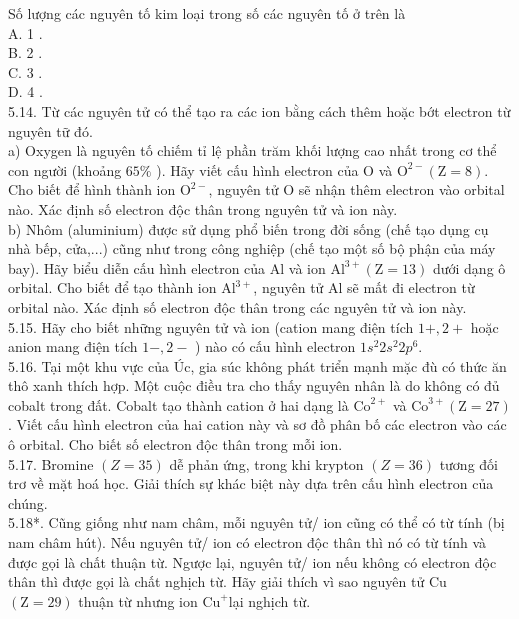 \documentclass[10pt]{article}
\begin{document}
Số lượng các nguyên tố kim loại trong số các nguyên tố ở trên là\\
A. 1 .\\
B. 2 .\\
C. 3 .\\
D. 4 .\\
5.14. Từ các nguyên tử có thể tạo ra các ion bằng cách thêm hoặc bớt electron từ nguyên tữ đó.\\
a) Oxygen là nguyên tố chiếm tỉ lệ phần trăm khối lượng cao nhất trong cơ thể con người (khoảng $65 \%$ ). Hãy viết cấu hình electron của O và $\mathrm{O}^{2-}(\mathrm{Z}=8)$. Cho biết để hình thành ion $\mathrm{O}^{2-}$, nguyên tử O sẽ nhận thêm electron vào orbital nào. Xác định số electron độc thân trong nguyên tử và ion này.\\
b) Nhôm (aluminium) được sử dụng phổ biến trong đời sống (chế tạo dụng cụ nhà bếp, cửa,...) cũng như trong công nghiệp (chế tạo một số bộ phận của máy bay). Hãy biểu diễn cấu hình electron của Al và ion $\mathrm{Al}^{3+}(\mathrm{Z}=13)$ dưới dạng ô orbital. Cho biết để tạo thành ion $\mathrm{Al}^{3+}$, nguyên tử Al sẽ mất đi electron từ orbital nào. Xác định số electron độc thân trong các nguyên tử và ion này.\\
5.15. Hãy cho biết những nguyên tử và ion (cation mang điện tích $1+, 2+$ hoặc anion mang điện tích $1-, 2-$ ) nào có cấu hình electron $1 s^{2} 2 s^{2} 2 p^{6}$.\\
5.16. Tại một khu vực của Úc, gia súc không phát triển mạnh mặc đù có thức ăn thô xanh thích hợp. Một cuộc điều tra cho thấy nguyên nhân là do không có đủ cobalt trong đất. Cobalt tạo thành cation ở hai dạng là $\mathrm{Co}^{2+}$ và $\mathrm{Co}^{3+}(\mathrm{Z}=27)$. Viết cấu hình electron của hai cation này và sơ đồ phân bố các electron vào các ô orbital. Cho biết số electron độc thân trong mỗi ion.\\
5.17. Bromine $(Z=35)$ dễ phản ứng, trong khi krypton $(Z=36)$ tương đối trơ về mặt hoá học. Giải thích sự khác biệt này dựa trên cấu hình electron của chúng.\\
5.18*. Cũng giống như nam châm, mỗi nguyên tử/ ion cũng có thể có từ tính (bị nam châm hút). Nếu nguyên tử/ ion có electron độc thân thì nó có từ tính và được gọi là chất thuận từ. Ngược lại, nguyên tử/ ion nếu không có electron độc thân thì được gọi là chất nghịch từ. Hãy giải thích vì sao nguyên tử Cu $(\mathrm{Z}=29)$ thuận từ nhưng ion $\mathrm{Cu}^{+}$lại nghịch từ.
\end{document}

